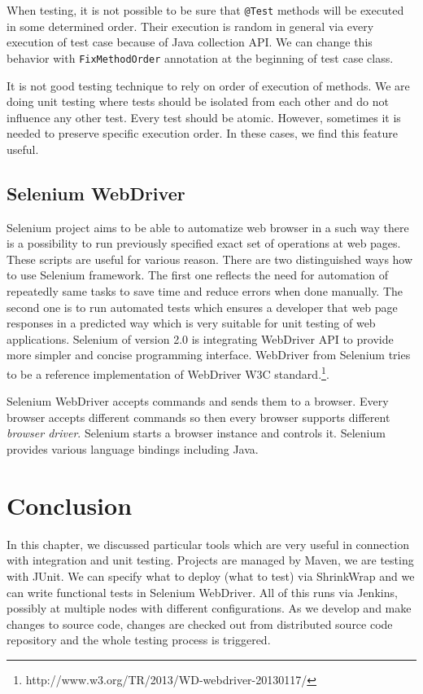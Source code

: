 \documentclass[12pt,final,oneside]{fithesis}
\begin{document}
When testing, it is not possible to be sure that \texttt{@Test} methods will be executed in some determined order. Their execution is random in general via every execution of test case because of Java collection API. We can change this behavior with \texttt{FixMethodOrder} annotation at the beginning of test case class.

It is not good testing technique to rely on order of execution of methods. We are doing unit testing where tests should be isolated from each other and do not influence any other test. Every test should be atomic. However, sometimes it is needed to preserve specific execution order. In these cases, we find this feature useful.

	\subsection{Selenium WebDriver}
	
Selenium project aims to be able to automatize web browser in a such way there is a possibility to run previously specified exact set of operations at web pages. These scripts are useful for various reason. There are two distinguished  ways how to use Selenium framework. The first one reflects the need for automation of repeatedly same tasks to save time and reduce errors when done manually. The second one is to run automated tests which ensures a developer that web page responses in a predicted way which is very suitable for unit testing of web applications. Selenium of version 2.0 is integrating WebDriver API to provide more simpler and concise programming interface. WebDriver from Selenium tries to be a reference implementation of WebDriver W3C standard.\footnote{http://www.w3.org/TR/2013/WD-webdriver-20130117/}.

Selenium WebDriver accepts commands and sends them to a browser. Every browser accepts different commands so then every browser supports different \textit{browser driver}. Selenium starts a browser instance and controls it. Selenium provides various language bindings including Java.

	\section{Conclusion}
	
In this chapter, we discussed particular tools which are very useful in connection with integration and unit testing. Projects are managed by Maven, we are testing with JUnit. We can specify what to deploy (what to test) via ShrinkWrap and we can write functional tests in Selenium WebDriver. All of this runs via Jenkins, possibly at multiple nodes with different configurations. As we develop and make changes to source code, changes are checked out from distributed source code repository and the whole testing process is triggered. 
\end{document}
